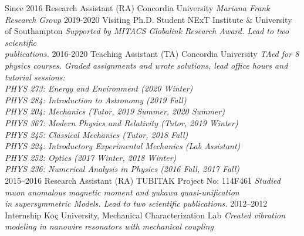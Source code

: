 \documentclass[]{friggeri-cv}
\begin{document}
\begin{entrylist}
    \entry
	{Since 2016}
	{Research Assistant (RA)}
	{Concordia University}
	{\emph{Mariana Frank Research Group}}	
	 \entry
    {2019-2020}
    {Visiting Ph.D. Student}
    {NExT Institute \& University of Southampton}
    {\emph {Supported by MITACS Globalink Research Award. Lead to two scientific \\ publications.}}
    \entry
    {2016-2020}
    {Teaching Assistant (TA)}
    {Concordia University}
    {\emph{
    TAed for 8 physics courses. Graded assignments and wrote solutions, lead office hours and tutorial sessions: \\
    PHYS 273: Energy and Environment (2020 Winter) \\		
    PHYS 284: Introduction to Astronomy (2019 Fall) \\
    PHYS 204: Mechanics (Tutor, 2019 Summer, 2020 Summer) \\    		
    PHYS 367: Modern Physics and Relativity (Tutor, 2019 Winter) \\		
    PHYS 245: Classical Mechanics (Tutor, 2018 Fall) \\
	PHYS 224: Introductory Experimental Mechanics (Lab Assistant) \\    		
    PHYS 252: Optics (2017 Winter, 2018 Winter) \\ 
	PHYS 236: Numerical Analysis in Physics (2016 Fall, 2017 Fall) \\
	}}
    \entry
    {2015--2016}
    {Research Assistant (RA)}
    {TUBITAK Project No: 114F461}
    {\emph{Studied muon anomalous magnetic moment and yukawa quasi-unification \\ in supersymmetric Models. Lead to two scientific publications.}}  
    \entry
  	{2012--2012}
  	{Internship}
  	{Koç University, Mechanical Characterization Lab}
  	{\emph{Created vibration modeling in nanowire resonators with mechanical coupling }}  
\end{entrylist}

\newpage
\end{document}
